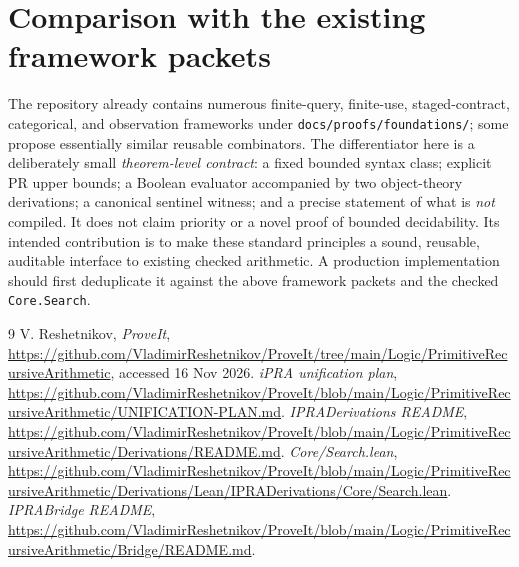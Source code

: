 \documentclass[11pt]{article}
\begin{document}
\section{Comparison with the existing framework packets}
The repository already contains numerous finite-query, finite-use, staged-contract, categorical, and observation frameworks under \texttt{docs/proofs/foundations/}; some propose essentially similar reusable combinators. The differentiator here is a deliberately small \emph{theorem-level contract}: a fixed bounded syntax class; explicit PR upper bounds; a Boolean evaluator accompanied by two object-theory derivations; a canonical sentinel witness; and a precise statement of what is \emph{not} compiled. It does not claim priority or a novel proof of bounded decidability. Its intended contribution is to make these standard principles a sound, reusable, auditable interface to existing checked arithmetic. A production implementation should first deduplicate it against the above framework packets and the checked \texttt{Core.Search}.

\begin{thebibliography}{9}
 V. Reshetnikov, \emph{ProveIt}, \url{https://github.com/VladimirReshetnikov/ProveIt/tree/main/Logic/PrimitiveRecursiveArithmetic}, accessed 16 Nov 2026.
 \emph{iPRA unification plan}, \url{https://github.com/VladimirReshetnikov/ProveIt/blob/main/Logic/PrimitiveRecursiveArithmetic/UNIFICATION-PLAN.md}.
 \emph{IPRADerivations README}, \url{https://github.com/VladimirReshetnikov/ProveIt/blob/main/Logic/PrimitiveRecursiveArithmetic/Derivations/README.md}.
 \emph{Core/Search.lean}, \url{https://github.com/VladimirReshetnikov/ProveIt/blob/main/Logic/PrimitiveRecursiveArithmetic/Derivations/Lean/IPRADerivations/Core/Search.lean}.
 \emph{IPRABridge README}, \url{https://github.com/VladimirReshetnikov/ProveIt/blob/main/Logic/PrimitiveRecursiveArithmetic/Bridge/README.md}.
\end{thebibliography}
\end{document}
